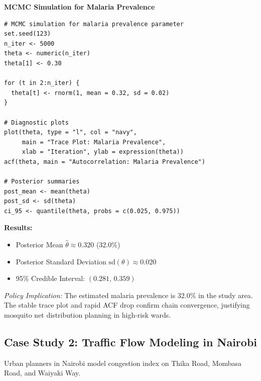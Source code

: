 \documentclass[12pt,a4paper]{article}
\begin{document}
\begin{example}
\textbf{MCMC Simulation for Malaria Prevalence}

\begin{verbatim}
# MCMC simulation for malaria prevalence parameter
set.seed(123)
n_iter <- 5000
theta <- numeric(n_iter)
theta[1] <- 0.30

for (t in 2:n_iter) {
  theta[t] <- rnorm(1, mean = 0.32, sd = 0.02)
}

# Diagnostic plots
plot(theta, type = "l", col = "navy",
     main = "Trace Plot: Malaria Prevalence",
     xlab = "Iteration", ylab = expression(theta))
acf(theta, main = "Autocorrelation: Malaria Prevalence")

# Posterior summaries
post_mean <- mean(theta)
post_sd <- sd(theta)
ci_95 <- quantile(theta, probs = c(0.025, 0.975))
\end{verbatim}

\textbf{Results:}
\begin{itemize}[leftmargin=1.5em]
    \item Posterior Mean $\hat{\theta} \approx 0.320$ ($32.0\%$)
    \item Posterior Standard Deviation $\text{sd}(\theta) \approx 0.020$
    \item 95\% Credible Interval: $(0.281, \, 0.359)$
\end{itemize}
\textit{Policy Implication:} The estimated malaria prevalence is 32.0\% in the study area. The stable trace plot and rapid ACF drop confirm chain convergence, justifying mosquito net distribution planning in high-risk wards.
\end{example}

\subsection{Case Study 2: Traffic Flow Modeling in Nairobi}

Urban planners in Nairobi model congestion index on Thika Road, Mombasa Road, and Waiyaki Way.
\end{document}
